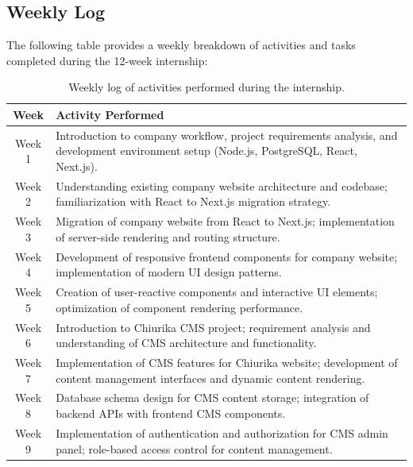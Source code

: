 \subsection{Weekly Log}

The following table provides a weekly breakdown of activities and tasks completed during the 12-week internship:

\begin{table}[H]
    \centering
    \caption{Weekly log of activities performed during the internship.}
\renewcommand{\arraystretch}{1.3}
\begin{tabular}{|c|p{13cm}|}

\hline
\textbf{Week} & \textbf{Activity Performed} \\
\hline

Week 1 & Introduction to company workflow, project requirements analysis, and development environment setup (Node.js, PostgreSQL, React, Next.js). \\
\hline

Week 2 & Understanding existing company website architecture and codebase; familiarization with React to Next.js migration strategy. \\
\hline

Week 3 & Migration of company website from React to Next.js; implementation of server-side rendering and routing structure. \\
\hline

Week 4 & Development of responsive frontend components for company website; implementation of modern UI design patterns. \\
\hline

Week 5 & Creation of user-reactive components and interactive UI elements; optimization of component rendering performance. \\
\hline

Week 6 & Introduction to Chiurika CMS project; requirement analysis and understanding of CMS architecture and functionality. \\
\hline

Week 7 & Implementation of CMS features for Chiurika website; development of content management interfaces and dynamic content rendering. \\
\hline

Week 8 & Database schema design for CMS content storage; integration of backend APIs with frontend CMS components. \\
\hline

Week 9 & Implementation of authentication and authorization for CMS admin panel; role-based access control for content management. \\
\hline


\end{tabular}
\end{table}

